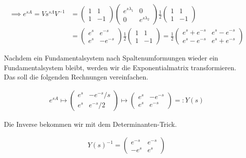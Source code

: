 \begin{solution}
\begin{align*}
    \implies
    e^{sA}
    =
    V s^{s \Lambda} V^{-1}
    & =
    \begin{pmatrix}
        1 &  1 \\
        1 & -1
    \end{pmatrix}
    \begin{pmatrix}
        e^{s \lambda_1} & 0 \\
        0               & e^{s \lambda_2}
    \end{pmatrix}
    \frac{1}{2}
    \begin{pmatrix}
        1 &  1 \\
        1 & -1
    \end{pmatrix} \\
    & =
    \begin{pmatrix}
        e^s &  e^{-s} \\
        e^s & -e^{-s}
    \end{pmatrix}
    \frac{1}{2}
    \begin{pmatrix}
        1 &  1 \\
        1 & -1
    \end{pmatrix}
    =
    \frac{1}{2}
    \begin{pmatrix}
        e^s + e^{-s} & e^s - e^{-s} \\
        e^s - e^{-s} & e^s + e^{-s}
    \end{pmatrix}
\end{align*}

Nachdem ein Fundamentalsystem nach Spaltenumformungen wieder ein Fundamentalsystem bleibt, werden wir die Exponentialmatrix transformieren.
Das soll die folgenden Rechnungen vereinfachen.

\begin{align*}
    e^{sA}
    \mapsto
    \begin{pmatrix}
        e^s & -e^{-s} / s \\
        e^s &  e^{-s} / 2
    \end{pmatrix}
    \mapsto
    \begin{pmatrix}
        e^s & -e^{-s} \\
        e^s &  e^{-s}
    \end{pmatrix}
    =: Y(s)
\end{align*}

Die Inverse bekommen wir mit dem Determinanten-Trick.

\begin{align*}
    Y(s)^{-1}
    =
    \begin{pmatrix}
         e^{-s} & e^{-s} \\
        -e^s    & e^s
    \end{pmatrix}
\end{align*}


\end{solution}
